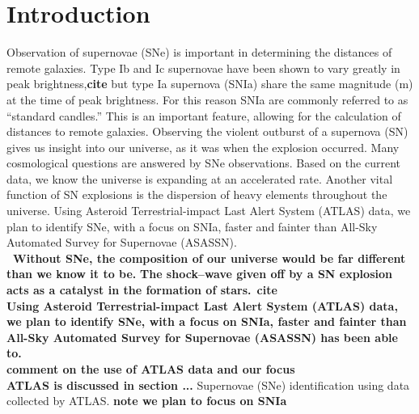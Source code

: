 \documentclass[aps,prb,twocolumn,superscriptaddress]{revtex4-1}
\begin{document}
\section{Introduction}
Observation of supernovae (SNe) is important in determining the distances 
of remote galaxies.  
Type Ib and Ic supernovae have been shown to vary greatly in peak brightness,{\bf cite} 
but type Ia supernova (SNIa) share the same magnitude (m) at the time of peak brightness.  
For this reason SNIa are commonly referred to as ``standard candles.''  This is 
an important feature, allowing for the calculation of distances to remote galaxies.  
Observing the violent outburst of a supernova (SN) gives us insight into our universe, 
as it was when the explosion occurred.  
Many cosmological questions are answered by SNe observations.  Based on the current 
data, we know the universe is expanding at an accelerated rate.  Another vital 
function of SN explosions is the dispersion of heavy elements throughout the universe.  
Using Asteroid Terrestrial-impact Last Alert System (ATLAS) data, we plan to identify 
SNe, with a focus on SNIa, faster and fainter than All-Sky Automated Survey for Supernovae 
(ASASSN).
{\bf ~\\~Without SNe, the composition of our universe would be far different than we know it to be.}
{\bf The shock--wave given off by a SN explosion acts as a catalyst in the formation of stars.}~{\bf cite}\\

{\bf Using Asteroid Terrestrial-impact Last Alert System (ATLAS) data, we plan to identify 
SNe, with a focus on SNIa, faster and fainter than All-Sky Automated Survey for Supernovae (ASASSN) 
has been able to.}\\


{\bf comment on the use of ATLAS data and our focus\\ATLAS is discussed in section ...}
Supernovae (SNe) identification using data collected by ATLAS.
{\bf note we plan to focus on SNIa}


\end{document}
